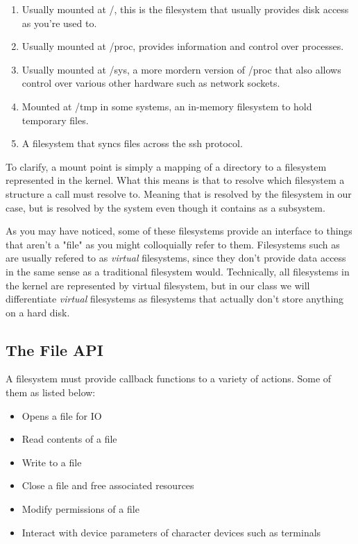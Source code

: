 \begin{enumerate}

  \item {} Usually mounted at /, this is the filesystem that usually provides disk access as you're used to.
  \item {} Usually mounted at /proc, provides information and control over processes.
  \item {} Usually mounted at /sys, a more mordern version of /proc that also allows control over various other hardware such as network sockets.
  \item {} Mounted at /tmp in some systems, an in-memory filesystem to hold temporary files.
  \item {} A filesystem that syncs files across the ssh protocol.

\end{enumerate}

To clarify, a mount point is simply a mapping of a directory to a filesystem represented in the kernel. What this means is that to resolve which filesystem a structure a call must resolve to. Meaning that  is resolved by the  filesystem in our case, but  is resolved by the  system even though it contains \keyword{/} as a subsystem.

As you may have noticed, some of these filesystems provide an interface to things that aren't a "file" as you might colloquially refer to them. Filesystems such as  are usually refered to as \emph{virtual} filesystems, since they don't provide data access in the same sense as a traditional filesystem would. Technically, all filesystems in the kernel are represented by virtual filesystem, but in our class we will differentiate \emph{virtual} filesystems as filesystems that actually don't store anything on a hard disk.

\subsection{The File API}

A filesystem must provide callback functions to a variety of actions. Some of them as listed below:

\begin{itemize}
  \item {} Opens a file for IO
  \item {} Read contents of a file
  \item {} Write to a file
  \item {} Close a file and free associated resources
  \item {} Modify permissions of a file
  \item {} Interact with device parameters of character devices such as terminals
\end{itemize}

